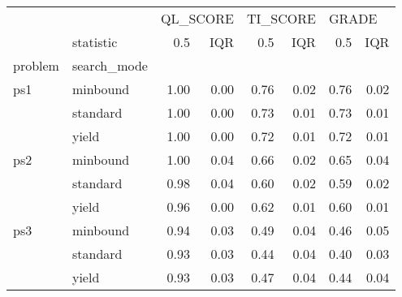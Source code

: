 \begin{tabular}{llrrrrrr}
\toprule
    & {} & \multicolumn{2}{l}{QL\_SCORE} & \multicolumn{2}{l}{TI\_SCORE} & \multicolumn{2}{l}{GRADE} \\
    & statistic &      0.5 &  IQR &      0.5 &  IQR &   0.5 &  IQR \\
problem & search\_mode &          &      &          &      &       &      \\
\midrule
ps1 & minbound &     1.00 & 0.00 &     0.76 & 0.02 &  0.76 & 0.02 \\
    & standard &     1.00 & 0.00 &     0.73 & 0.01 &  0.73 & 0.01 \\
    & yield &     1.00 & 0.00 &     0.72 & 0.01 &  0.72 & 0.01 \\
ps2 & minbound &     1.00 & 0.04 &     0.66 & 0.02 &  0.65 & 0.04 \\
    & standard &     0.98 & 0.04 &     0.60 & 0.02 &  0.59 & 0.02 \\
    & yield &     0.96 & 0.00 &     0.62 & 0.01 &  0.60 & 0.01 \\
ps3 & minbound &     0.94 & 0.03 &     0.49 & 0.04 &  0.46 & 0.05 \\
    & standard &     0.93 & 0.03 &     0.44 & 0.04 &  0.40 & 0.03 \\
    & yield &     0.93 & 0.03 &     0.47 & 0.04 &  0.44 & 0.04 \\
\bottomrule
\end{tabular}
